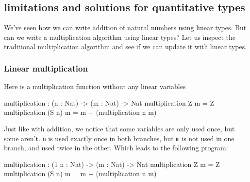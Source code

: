 \documentclass[
]{article}
\newenvironment{Shaded}{}{}
\newcommand{\DataTypeTok}[1]{\textcolor[rgb]{0.56,0.13,0.00}{#1}}
\newcommand{\DecValTok}[1]{\textcolor[rgb]{0.25,0.63,0.44}{#1}}
\newcommand{\NormalTok}[1]{#1}
\newcommand{\OperatorTok}[1]{\textcolor[rgb]{0.40,0.40,0.40}{#1}}
\newcommand{\OtherTok}[1]{\textcolor[rgb]{0.00,0.44,0.13}{#1}}
\begin{document}
\hypertarget{limitations-and-solutions-for-quantitative-types}{%
\subsection{limitations and solutions for quantitative
types}\label{limitations-and-solutions-for-quantitative-types}}

We've seen how we can write addition of natural numbers using linear
types. But can we write a multiplication algorithm using linear types?
Let us inspect the traditional multiplication algorithm and see if we
can update it with linear types.

\hypertarget{linear-multiplication}{%
\subsubsection{Linear multiplication}\label{linear-multiplication}}

Here is a multiplication function without any linear variables

\begin{Shaded}
\begin{Highlighting}[]
\NormalTok{multiplication }\OperatorTok{:}\NormalTok{ (n }\OperatorTok{:} \DataTypeTok{Nat}\NormalTok{) }\OtherTok{{-}\textgreater{}}\NormalTok{ (m }\OperatorTok{:} \DataTypeTok{Nat}\NormalTok{) }\OtherTok{{-}\textgreater{}} \DataTypeTok{Nat}
\NormalTok{multiplication }\DataTypeTok{Z}\NormalTok{ m }\OtherTok{=} \DataTypeTok{Z} 
\NormalTok{multiplication (}\DataTypeTok{S}\NormalTok{ n) m }\OtherTok{=}\NormalTok{ m }\OperatorTok{+}\NormalTok{ (multiplication n m)}
\end{Highlighting}
\end{Shaded}

Just like with addition, we notice that some variables are only used
once, but some aren't. \texttt{n} is used exactly once in both branches,
but \texttt{m} is not used in one branch, and used twice in the other.
Which leads to the following program:

\begin{Shaded}
\begin{Highlighting}[]
\NormalTok{ multiplication }\OperatorTok{:}\NormalTok{ (}\DecValTok{1}\NormalTok{ n }\OperatorTok{:} \DataTypeTok{Nat}\NormalTok{) }\OtherTok{{-}\textgreater{}}\NormalTok{ (m }\OperatorTok{:} \DataTypeTok{Nat}\NormalTok{) }\OtherTok{{-}\textgreater{}} \DataTypeTok{Nat}
\NormalTok{ multiplication }\DataTypeTok{Z}\NormalTok{ m }\OtherTok{=} \DataTypeTok{Z}
\NormalTok{ multiplication (}\DataTypeTok{S}\NormalTok{ n) m }\OtherTok{=}\NormalTok{ m }\OperatorTok{+}\NormalTok{ (multiplication n m)}
\end{Highlighting}
\end{Shaded}
\end{document}
